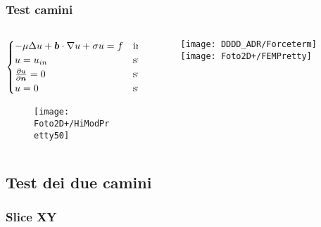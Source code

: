 \begin{frame}
\frametitle{Test camini}
\begin{columns}
\begin{column}{0.5 \paperwidth}
\begin{equation}
\label{eq: problema forte}
\begin{cases}
-\mu\Delta u + \boldsymbol{b}\cdot \nabla u + \sigma u = f & \text{in $\Omega$}\\
u=u_{in} & \text{su $\Gamma_{in}$}\\
\frac{\partial u}{\partial \boldsymbol{n}}=0 & \text{su $\Gamma_{out}$ }\\
u=0 & \text{su $\Gamma _{vaso}$} \\
\end{cases}
\end{equation}
\begin{figure}
{\texttt{[image: Foto2D+/HiModPretty50]}}
\end{figure}
\end{column}

\begin{column}{0.5 \paperwidth}
\begin{figure}
\subfigure
{\texttt{[image: DDDD\_ADR/Forceterm]}}
\subfigure
{\texttt{[image: Foto2D+/FEMPretty]}}
\end{figure}
\end{column}

\end{columns}
\end{frame}

\subsection{Test dei due camini}
\begin{frame}
\frametitle{Slice XY}
\begin{columns}

\begin{column}{0.5 \paperwidth}
\begin{figure}
\end{figure}
\end{column}

\begin{column}{0.5 \paperwidth}
\begin{figure}
\end{figure}
\end{column}

\end{columns}
\end{frame}

